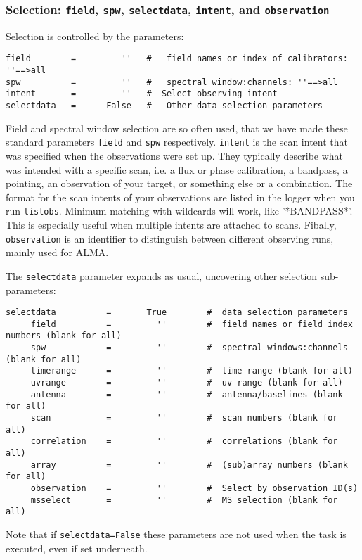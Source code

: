 \subsubsection{Selection: {\tt field}, {\tt spw}, {\tt selectdata},
  {\tt intent}, and {\tt observation} }
\label{section:cal.solve.pars.select}

Selection is controlled by the parameters:
\small
\begin{verbatim}
field        =         ''   #   field names or index of calibrators: ''==>all
spw          =         ''   #   spectral window:channels: ''==>all 
intent       =         ''   #  Select observing intent
selectdata   =      False   #   Other data selection parameters
\end{verbatim}
\normalsize

Field and spectral window selection are so often used, that we have
made these standard parameters {\tt field} and {\tt spw}
respectively. {\tt intent} is the scan intent that was specified when
the observations were set up. They typically describe what was
intended with a specific scan, i.e. a flux or phase calibration, a
bandpass, a pointing, an observation of your target, or something else
or a combination. The format for the scan intents of your observations
are listed in the logger when you run {\tt listobs}. Minimum matching
with wildcards will work, like '*BANDPASS*'. This is especially useful
when multiple intents are attached to scans.  Fibally, {\tt
  observation} is an identifier to distinguish between different
observing runs, mainly used for ALMA.

The {\tt selectdata} parameter expands as usual, uncovering other
selection sub-parameters:
\small
\begin{verbatim}
selectdata          =       True        #  data selection parameters
     field          =         ''        #  field names or field index numbers (blank for all)
     spw            =         ''        #  spectral windows:channels (blank for all)
     timerange      =         ''        #  time range (blank for all)
     uvrange        =         ''        #  uv range (blank for all)
     antenna        =         ''        #  antenna/baselines (blank for all)
     scan           =         ''        #  scan numbers (blank for all)
     correlation    =         ''        #  correlations (blank for all)
     array          =         ''        #  (sub)array numbers (blank for all)
     observation    =         ''        #  Select by observation ID(s)
     msselect       =         ''        #  MS selection (blank for all)
\end{verbatim}
\normalsize
Note that if {\tt selectdata=False} these parameters are not used when
the task is executed, even if set underneath.

